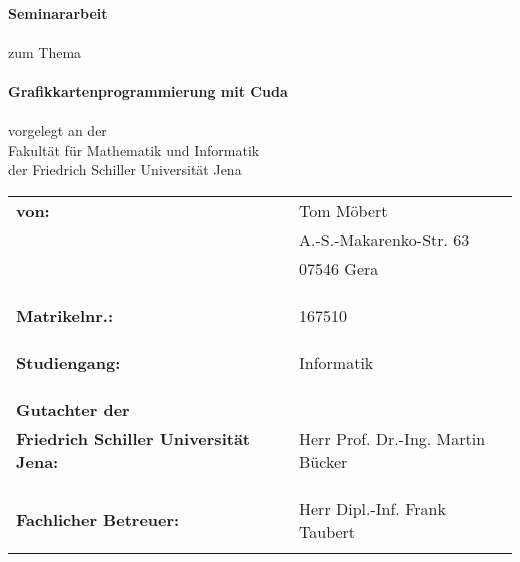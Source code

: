 \documentclass[a4paper,oneside,numbers=noenddot,fontsize=12pt,open=right]{scrreprt}
\title{\thema}
\def \author{Tom Möbert}
\def \matrikelnummer{167510}
\def \betrieb{Carl Zeiss SMT GmbH}
\def \hochschule{Friedrich Schiller Universität Jena}
\def \hochschuleGenitivS{\hochschule}
\def \fmi{Fakultät für Mathematik und Informatik}
\def \studiengang{Informatik}
\def \arbeit{Seminararbeit}
\def \thema{Grafikkartenprogrammierung mit Cuda}
\begin{document}
\begin{titlepage}
    \begin{center}
    ~\vspace{1cm}\\
   {\fontsize{35}{45}\selectfont \textbf{\MakeUppercase \arbeit}}\\
    ~\vspace{0.5cm}\\
    zum Thema\\
    ~\vspace{0.5cm}\\
    \textbf{\glqq\thema\grqq}\\
    ~\vspace{0.5cm}\\
    vorgelegt an der\\
    {\fmi}\\
    {der \hochschuleGenitivS}
    \vspace{2cm}

 \normalsize{
    \begin{tabular}{lrl}
    	\textbf{von:} &~& {\author} \\
    	&~& A.-S.-Makarenko-Str. 63 \\
    	&~& 07546 Gera \\ \\ \\ \\ 
    	\textbf{Matrikelnr.:}&~& {\matrikelnummer} \\ \\ \\ \\
    	\textbf{Studiengang:} &~& {\studiengang} \\ \\ \\ \\
		\textbf{Gutachter der }\\ \textbf{\hochschule:} &~& Herr Prof. Dr.-Ing. Martin Bücker \\ \\ \\ \\
    	\textbf{Fachlicher Betreuer:} &~& Herr Dipl.-Inf. Frank Taubert \\ \\
    \end{tabular}\\
    }
  \end{center}
\end{titlepage}
\end{document}
